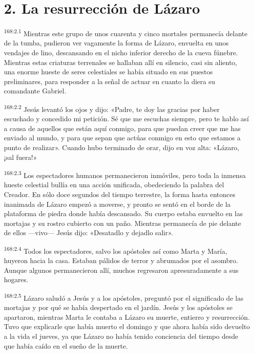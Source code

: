 \section*{2. La resurrección de Lázaro}
\par 
\textsuperscript{168:2.1} Mientras este grupo de unos cuarenta y cinco mortales permanecía delante de la tumba, pudieron ver vagamente la forma de Lázaro, envuelta en unos vendajes de lino, descansando en el nicho inferior derecho de la cueva fúnebre. Mientras estas criaturas terrenales se hallaban allí en silencio, casi sin aliento, una enorme hueste de seres celestiales se había situado en sus puestos preliminares, para responder a la señal de actuar en cuanto la diera su comandante Gabriel.

\par 
\textsuperscript{168:2.2} Jesús levantó los ojos y dijo: «Padre, te doy las gracias por haber escuchado y concedido mi petición. Sé que me escuchas siempre, pero te hablo así a causa de aquellos que están aquí conmigo, para que puedan creer que me has enviado al mundo, y para que sepan que actúas conmigo en esto que estamos a punto de realizar». Cuando hubo terminado de orar, dijo en voz alta: «Lázaro, ¡sal fuera!»

\par 
\textsuperscript{168:2.3} Los espectadores humanos permanecieron inmóviles, pero toda la inmensa hueste celestial bullía en una acción unificada, obedeciendo la palabra del Creador. En sólo doce segundos del tiempo terrestre, la forma hasta entonces inanimada de Lázaro empezó a moverse, y pronto se sentó en el borde de la plataforma de piedra donde había descansado. Su cuerpo estaba envuelto en las mortajas y su rostro cubierto con un paño. Mientras permanecía de pie delante de ellos ---vivo--- Jesús dijo: «Desatadlo y dejadlo salir».

\par 
\textsuperscript{168:2.4} Todos los espectadores, salvo los apóstoles así como Marta y María, huyeron hacia la casa. Estaban pálidos de terror y abrumados por el asombro. Aunque algunos permanecieron allí, muchos regresaron apresuradamente a sus hogares.

\par 
\textsuperscript{168:2.5} Lázaro saludó a Jesús y a los apóstoles, preguntó por el significado de las mortajas y por qué se había despertado en el jardín. Jesús y los apóstoles se apartaron, mientras Marta le contaba a Lázaro su muerte, entierro y resurrección. Tuvo que explicarle que había muerto el domingo y que ahora había sido devuelto a la vida el jueves, ya que Lázaro no había tenido conciencia del tiempo desde que había caído en el sueño de la muerte.

